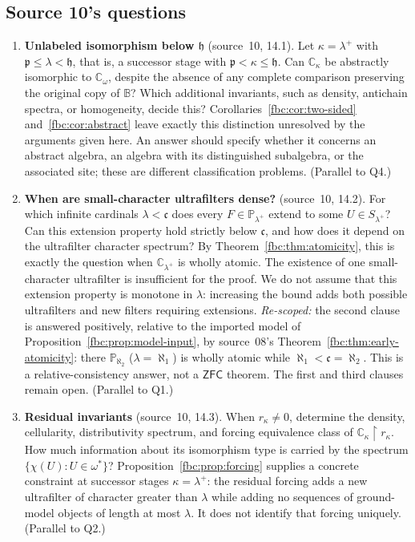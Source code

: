 \documentclass[11pt,letterpaper]{article}
\theoremstyle{definition}
\theoremstyle{remark}
\newcommand{\om}{\omega}
\newcommand{\B}{\mathbb B}
\newcommand{\C}{\mathbb C}
\newcommand{\PP}{\mathbb P}
\newcommand{\cp}{\mathfrak p}
\newcommand{\cc}{\mathfrak c}
\newcommand{\ch}{\mathfrak h}
\newcommand{\res}{\mathbin{\upharpoonright}}
\newcommand{\ZFC}{\mathsf{ZFC}}
\begin{document}
\subsection{Source 10's questions}
\begin{enumerate}[label=\textbf{R\arabic*.},leftmargin=3em]
\item \textbf{Unlabeled isomorphism below $\ch$} (source~10, 14.1).
Let $\kappa=\lambda^+$ with $\cp\leq\lambda<\ch$, that is, a successor
stage with $\cp<\kappa\leq\ch$. Can $\C_\kappa$ be abstractly
isomorphic to $\C_\om$, despite the absence of any complete comparison
preserving the original copy of $\B$? Which additional invariants,
such as density, antichain spectra, or homogeneity, decide this?
Corollaries~\ref{fbc:cor:two-sided} and~\ref{fbc:cor:abstract} leave
exactly this distinction unresolved by the arguments given here. An
answer should specify whether it concerns an abstract algebra, an algebra
with its distinguished subalgebra, or the associated site; these are
different classification problems. (Parallel to Q4.)

\item \textbf{When are small-character ultrafilters dense?} (source~10,
14.2). For which infinite cardinals $\lambda<\cc$ does every
$F\in\PP_{\lambda^+}$ extend to some $U\in S_{\lambda^+}$? Can this
extension property hold strictly below $\cc$, and how does it depend on
the ultrafilter character spectrum? By Theorem~\ref{fbc:thm:atomicity},
this is exactly the question when $\C_{\lambda^+}$ is wholly atomic. The
existence of one small-character ultrafilter is insufficient for the
proof. We do not assume that this extension property is monotone in
$\lambda$: increasing the bound adds both possible ultrafilters and new
filters requiring extensions.
\emph{Re-scoped:} the second clause is answered positively, relative to
the imported model of Proposition~\ref{fbc:prop:model-input}, by source~08's
Theorem~\ref{fbc:thm:early-atomicity}: there $\PP_{\aleph_2}$
($\lambda=\aleph_1$) is wholly atomic while $\aleph_1<\cc=\aleph_2$. This
is a relative-consistency answer, not a $\ZFC$ theorem. The first and
third clauses remain open. (Parallel to Q1.)

\item \textbf{Residual invariants} (source~10, 14.3). When
$r_\kappa\ne0$, determine the density, cellularity, distributivity
spectrum, and forcing equivalence class of $\C_\kappa\res r_\kappa$. How
much information about its isomorphism type is carried by the spectrum
$\{\chi(U):U\in\om^*\}$? Proposition~\ref{fbc:prop:forcing} supplies a
concrete constraint at successor stages $\kappa=\lambda^+$: the residual
forcing adds a new ultrafilter of character greater than $\lambda$ while
adding no sequences of ground-model objects of length at most
$\lambda$. It does not identify that forcing uniquely. (Parallel to Q2.)


\end{enumerate}
\end{document}
